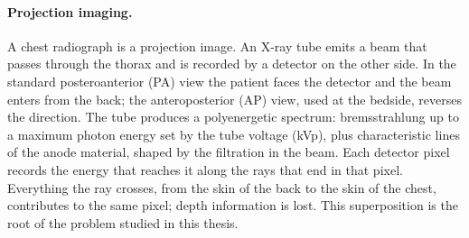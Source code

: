 \paragraph{Projection imaging.} A chest radiograph is a projection image. An X-ray tube emits a beam that passes through the thorax and is
recorded by a detector on the other side. In the standard posteroanterior (PA) view the patient faces the detector and the beam enters from the
back; the anteroposterior (AP) view, used at the bedside, reverses the direction. The tube produces a polyenergetic spectrum: bremsstrahlung up to
a maximum photon energy set by the tube voltage (kVp), plus characteristic lines of the anode material, shaped by the filtration in the beam. Each
detector pixel records the energy that reaches it along the rays that end in that pixel. Everything the ray crosses, from the skin of the back to
the skin of the chest, contributes to the same pixel; depth information is lost. This superposition is the root of the problem studied in this
thesis.

